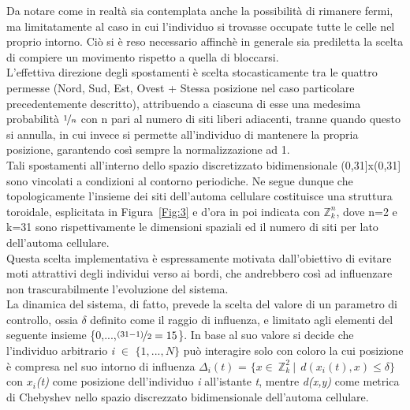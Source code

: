 \documentclass[letterpaper,10pt]{article}
\newcommand{\Zn}{$\mathbb{Z}^n_k$}
\newcommand{\Zii}{$\mathbb{Z}^2_k$}
\begin{document}
Da notare come in realtà sia contemplata anche la possibilità di rimanere fermi, ma limitatamente al caso in cui l'individuo si trovasse occupate tutte le celle nel proprio intorno. Ciò si è reso necessario affinchè in generale sia prediletta la scelta di compiere un movimento rispetto a quella di bloccarsi.
\\ L'effettiva direzione degli spostamenti è scelta stocasticamente tra le quattro permesse (Nord, Sud, Est, Ovest + Stessa posizione nel caso particolare precedentemente descritto), attribuendo a ciascuna di esse una medesima probabilità $\nicefrac{1}{n}$ con n pari al numero di siti liberi adiacenti, tranne quando questo si annulla, in cui invece si permette all’individuo di mantenere la propria posizione, garantendo così sempre la normalizzazione ad 1.
\\ Tali spostamenti all’interno dello spazio discretizzato bidimensionale (0,31]x(0,31] sono vincolati a condizioni al contorno periodiche. Ne segue dunque che topologicamente l’insieme dei siti dell’automa cellulare costituisce una struttura toroidale, esplicitata in Figura~\ref{Fig:3} e d'ora in poi indicata con \Zn, dove n=2 e k=31 sono rispettivamente le dimensioni spaziali ed il numero di siti per lato dell'automa cellulare.
\\ Questa scelta implementativa è espressamente motivata dall’obiettivo di evitare moti attrattivi degli individui verso ai bordi, che andrebbero così ad influenzare non trascurabilmente l’evoluzione del sistema.
\\ La dinamica del sistema, di fatto, prevede la scelta del valore di un parametro di controllo, ossia $\delta$ definito come il raggio di influenza, e limitato agli elementi del seguente insieme \{0,...,$\nicefrac{(31-1)}{2}=15$\}. In base al suo valore si decide che l'individuo arbitrario \textit{i} $\in$ $\{1,...,\textit{N} \}$ può interagire solo con coloro la cui posizione è compresa nel suo intorno di influenza $\Delta_{i}(t)$ = $\{ x \in \ $\Zii$ \ | \  \ d(x_{i}(t),x)\leqslant \delta \}$ con \textit{$x_{i}$(t)} come posizione dell'individuo \textit{i} all'istante \textit{t}, mentre \textit{d(x,y)} come metrica di Chebyshev nello spazio discrezzato bidimensionale dell'automa cellulare. 
\end{document}
